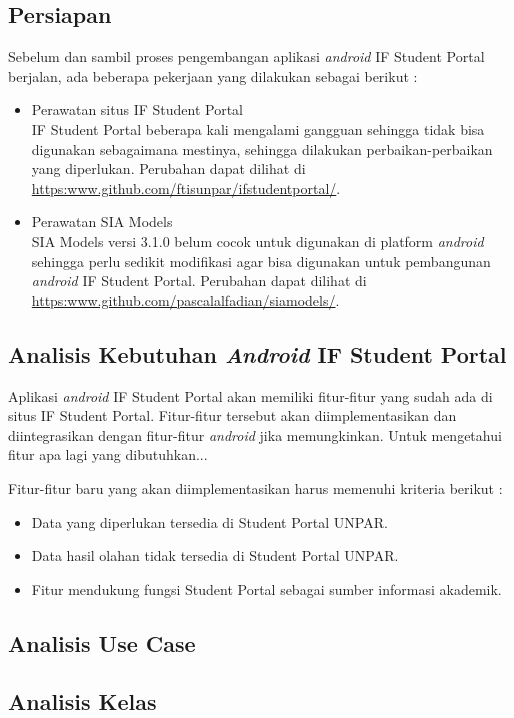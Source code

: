 \subsection{Persiapan}
Sebelum dan sambil proses pengembangan aplikasi \textit{android} IF Student Portal berjalan, ada beberapa pekerjaan yang dilakukan sebagai berikut :
\begin{itemize}
    \item Perawatan situs IF Student Portal\\
    IF Student Portal beberapa kali mengalami gangguan sehingga tidak bisa digunakan sebagaimana mestinya, sehingga dilakukan perbaikan-perbaikan yang diperlukan. Perubahan dapat dilihat di \url{https:www.github.com/ftisunpar/ifstudentportal/}.
    \item Perawatan SIA Models\\
    SIA Models versi 3.1.0 belum cocok untuk digunakan di platform \textit{android} sehingga perlu sedikit modifikasi agar bisa digunakan untuk pembangunan \textit{android} IF Student Portal. Perubahan dapat dilihat di \url{https:www.github.com/pascalalfadian/siamodels/}.
    
\end{itemize}

\subsection{Analisis Kebutuhan \textit{Android} IF Student Portal}
Aplikasi \textit{android} IF Student Portal akan memiliki fitur-fitur yang sudah ada di situs IF Student Portal. Fitur-fitur tersebut akan diimplementasikan dan diintegrasikan dengan fitur-fitur \textit{android} jika memungkinkan. Untuk mengetahui fitur apa lagi yang dibutuhkan...

Fitur-fitur baru yang akan diimplementasikan harus memenuhi kriteria berikut :
\begin{itemize}
    \item Data yang diperlukan tersedia di Student Portal UNPAR.
    \item Data hasil olahan tidak tersedia  di Student Portal UNPAR.
    \item Fitur mendukung fungsi Student Portal sebagai sumber informasi akademik.
\end{itemize}
\subsection{Analisis Use Case}
\subsection{Analisis Kelas}